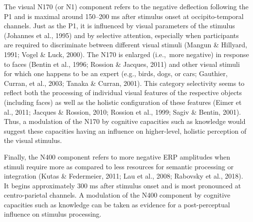 \documentclass[
  english,
  man,floatsintext]{apa7}
\begin{document}
The visual N170 (or N1) component refers to the negative deflection following the P1 and is maximal around 150--200 ms after stimulus onset at occipito-temporal channels. Just as the P1, it is influenced by visual parameters of the stimulus (Johannes et al., 1995) and by selective attention, especially when participants are required to discriminate between different visual stimuli (Mangun \& Hillyard, 1991; Vogel \& Luck, 2000). The N170 is enlarged (i.e.,~more negative) in response to faces (Bentin et al., 1996; Rossion \& Jacques, 2011) and other visual stimuli for which one happens to be an expert (e.g., birds, dogs, or cars; Gauthier, Curran, et al., 2003; Tanaka \& Curran, 2001). This category selectivity seems to reflect both the processing of individual visual features of the respective objects (including faces) as well as the holistic configuration of these features (Eimer et al., 2011; Jacques \& Rossion, 2010; Rossion et al., 1999; Sagiv \& Bentin, 2001). Thus, a modulation of the N170 by cognitive capacities such as knowledge would suggest these capacities having an influence on higher-level, holistic perception of the visual stimulus.

Finally, the N400 component refers to more negative ERP amplitudes when stimuli require more as compared to less resources for semantic processing or integration (Kutas \& Federmeier, 2011; Lau et al., 2008; Rabovsky et al., 2018). It begins approximately 300 ms after stimulus onset and is most pronounced at centro-parietal channels. A modulation of the N400 component by cognitive capacities such as knowledge can be taken as evidence for a post-perceptual influence on stimulus processing.
\end{document}
